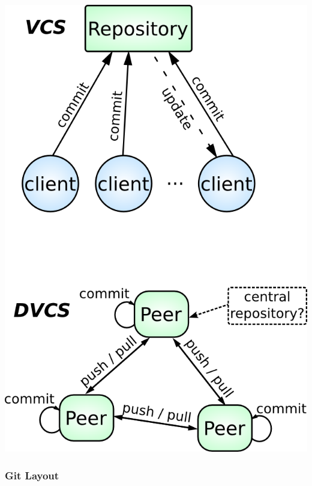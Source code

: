 \begin{frame}[plain]

  \begin{center}
    \includegraphics[height=1.0\textheight]{images/vcs-vs-dvcs.png}
  \end{center}
\end{frame}


\subsubsection{Git Layout}


